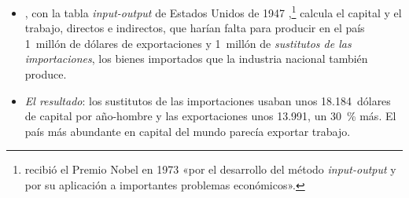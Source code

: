 \documentclass[11pt]{article}
\begin{document}
\begin{itemize}

\item \textcite{Leontief1953Domestic}, con la tabla \emph{input-output} de Estados Unidos de 1947 ,\footnote{ recibió el Premio Nobel en 1973 «por el desarrollo del método \emph{input-output} y por su aplicación a importantes problemas económicos»\nocite{Nobel1973Leontief}.} calcula el capital y el trabajo, directos e indirectos, que harían falta para producir en el país 1~millón de dólares de exportaciones y 1~millón de \emph{sustitutos de las importaciones}, los bienes importados que la industria nacional también produce.
\item \emph{El resultado}: los sustitutos de las importaciones usaban unos 18.184~dólares de capital por año-hombre y las exportaciones unos 13.991, un 30~\% más\nocite{Leontief1953Domestic,Nowak2019Leontief}. El país más abundante en capital del mundo parecía exportar trabajo.
\end{itemize}
\end{document}
